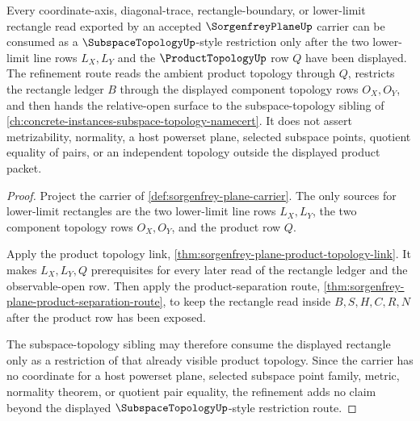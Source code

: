 \begin{theorem}
\label{thm:sorgenfrey-plane-subspace-topology-refinement}
Every coordinate-axis, diagonal-trace, rectangle-boundary, or lower-limit rectangle read exported by an accepted $\SorgenfreyPlaneUp$ carrier can be consumed as a $\SubspaceTopologyUp$-style restriction only after the two lower-limit line rows $L_X,L_Y$ and the $\ProductTopologyUp$ row $Q$ have been displayed. The refinement route reads the ambient product topology through $Q$, restricts the rectangle ledger $B$ through the displayed component topology rows $O_X,O_Y$, and then hands the relative-open surface to the subspace-topology sibling of \autoref{ch:concrete-instances-subspace-topology-namecert}. It does not assert metrizability, normality, a host powerset plane, selected subspace points, quotient equality of pairs, or an independent topology outside the displayed product packet.
\end{theorem}
\begin{proof}
Project the carrier of \autoref{def:sorgenfrey-plane-carrier}. The only sources for lower-limit rectangles are the two lower-limit line rows $L_X,L_Y$, the two component topology rows $O_X,O_Y$, and the product row $Q$.

Apply the product topology link, \autoref{thm:sorgenfrey-plane-product-topology-link}. It makes $L_X,L_Y,Q$ prerequisites for every later read of the rectangle ledger and the observable-open row. Then apply the product-separation route, \autoref{thm:sorgenfrey-plane-product-separation-route}, to keep the rectangle read inside $B,S,H,C,R,N$ after the product row has been exposed.

The subspace-topology sibling may therefore consume the displayed rectangle only as a restriction of that already visible product topology. Since the carrier has no coordinate for a host powerset plane, selected subspace point family, metric, normality theorem, or quotient pair equality, the refinement adds no claim beyond the displayed $\SubspaceTopologyUp$-style restriction route.
\end{proof}



